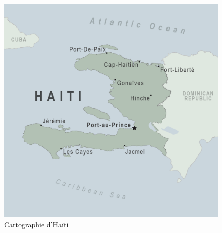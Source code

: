 \begin{figure}
    \centering
    \includegraphics[width=1\textwidth]{map-haiti.png}
    \caption{Cartographie d'Haïti}
\end{figure}